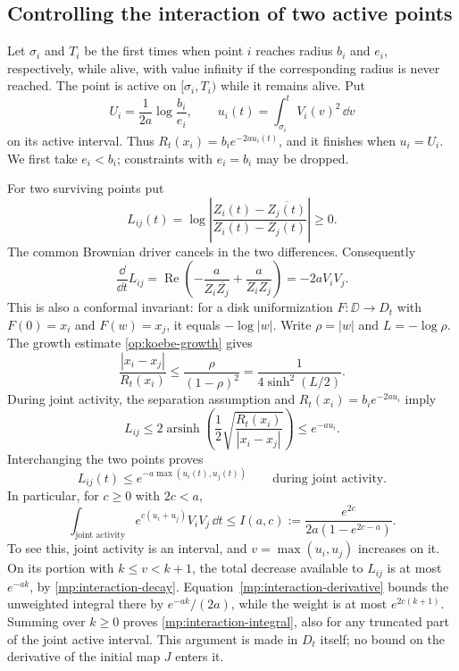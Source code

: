 \subsection{Controlling the interaction of two active points}

Let $\sigma_i$ and $T_i$ be the first times when point $i$ reaches
radius $b_i$ and $e_i$, respectively, while alive, with value infinity
if the corresponding radius is never reached. The point is active on
$[\sigma_i,T_i)$ while it remains alive. Put
\[
 U_i=\frac1{2a}\log\frac{b_i}{e_i},\qquad
 u_i(t)=\int_{\sigma_i}^t V_i(v)^2\,\dd v
\]
on its active interval. Thus $R_t(x_i)=b_i e^{-2au_i(t)}$, and it
finishes when $u_i=U_i$. We first take $e_i<b_i$; constraints with
$e_i=b_i$ may be dropped.

For two surviving points put
\[
 L_{ij}(t)=\log\left|
       \frac{Z_i(t)-\overline{Z_j(t)}}{Z_i(t)-Z_j(t)}\right|\ge0.
\]
The common Brownian driver cancels in the two differences. Consequently
\begin{equation}
 \frac{\dd}{\dd t}L_{ij}
 =\operatorname{Re}\left(-\frac a{Z_i\overline{Z_j}}
                            +\frac a{Z_iZ_j}\right)
 =-2aV_iV_j.
 \label{mp:interaction-derivative}
\end{equation}
This is also a conformal invariant: for a disk uniformization
$F:\DD\to D_t$ with $F(0)=x_i$ and $F(w)=x_j$, it equals
$-\log|w|$. Write $\rho=|w|$ and $L=-\log\rho$. The growth estimate
\eqref{op:koebe-growth} gives
\[
 \frac{|x_i-x_j|}{R_t(x_i)}
 \le\frac{\rho}{(1-\rho)^2}
 =\frac1{4\sinh^2(L/2)}.
\]
During joint activity, the separation assumption and
$R_t(x_i)=b_i e^{-2au_i}$ imply
\[
 L_{ij}\le2\operatorname{arsinh}\left(
       \frac12\sqrt{\frac{R_t(x_i)}{|x_i-x_j|}}\right)
 \le e^{-au_i}.
\]
Interchanging the two points proves
\begin{equation}
 L_{ij}(t)\le e^{-a\max(u_i(t),u_j(t))}
 \qquad\text{during joint activity}.
 \label{mp:interaction-decay}
\end{equation}
In particular, for $c\ge0$ with $2c<a$,
\begin{equation}
 \int_{\text{joint activity}}
       e^{c(u_i+u_j)}V_iV_j\,\dd t
 \le I(a,c):=\frac{e^{2c}}{2a(1-e^{2c-a})}.
 \label{mp:interaction-integral}
\end{equation}
To see this, joint activity is an interval, and
$v=\max(u_i,u_j)$ increases on it. On its portion with
$k\le v<k+1$, the total decrease available to $L_{ij}$ is at most
$e^{-ak}$, by \eqref{mp:interaction-decay}. Equation~\eqref{mp:interaction-derivative}
bounds the unweighted integral there by $e^{-ak}/(2a)$, while the
weight is at most $e^{2c(k+1)}$. Summing over $k\ge0$ proves
\eqref{mp:interaction-integral}, also for any truncated part of the
joint active interval. This argument is made in $D_t$ itself; no
bound on the derivative of the initial map $J$ enters it.

